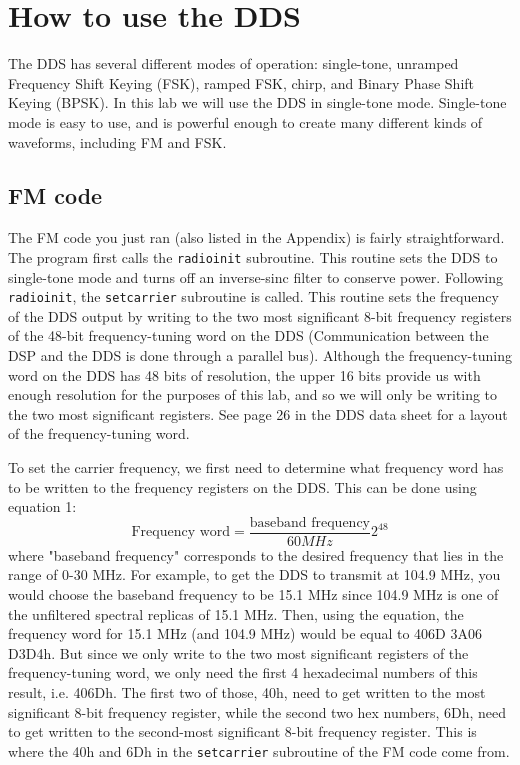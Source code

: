 \section{How to use the DDS}
The DDS has several different modes of operation: single-tone, unramped Frequency 
Shift Keying (FSK), ramped FSK, chirp, and Binary Phase Shift Keying (BPSK).  In
 this lab we will use the DDS in single-tone mode.  Single-tone mode is easy to use, 
and is powerful enough to create many different kinds of waveforms, including FM and FSK.

\subsection{FM code}
The FM code you just ran (also listed in the Appendix) is fairly straightforward.  
The program first calls the \verb+radioinit+ subroutine.  This routine sets the DDS
 to single-tone mode and turns off an inverse-sinc filter to conserve power. 
 Following \verb+radioinit+, the \verb+setcarrier+ subroutine is called.  This routine sets the 
frequency of the DDS output by writing to the two most significant 8-bit frequency 
registers of the 48-bit frequency-tuning word on the DDS (Communication between the DSP and 
the DDS is done through a parallel bus).  Although the frequency-tuning word on the DDS 
has 48 bits of resolution, the upper 16 bits provide us with enough resolution for the 
purposes of this lab, and so we will only be writing to the two most significant registers.  
See page 26 in the DDS data sheet for a layout of the frequency-tuning word.  

To set the carrier frequency, we first need to determine what frequency word has 
to be written to the frequency registers on the DDS.  This can be done using equation 1:
\begin{equation}
\mbox{Frequency word}=\frac{\mbox{baseband frequency}}{60 MHz}2^{48}
\end{equation}
where "baseband frequency" corresponds to the desired frequency that lies in the range 
of 0-30 MHz.  For example, to get the DDS to transmit at 104.9 MHz, you would choose 
the baseband frequency to be 15.1 MHz since 104.9 MHz is one of the unfiltered spectral replicas of 15.1 MHz. 
 Then, using the equation, the frequency word for 15.1 MHz (and 104.9 MHz) would be equal 
to 406D 3A06 D3D4h.  But since we only write to the two most significant registers of the 
frequency-tuning word, we only need the first 4 hexadecimal numbers of this result, i.e. 406Dh.  
The first two of those, 40h, need to get written to the most significant 8-bit frequency 
register, while the second two hex numbers, 6Dh, need to get written to the second-most 
significant 8-bit frequency register.  This is where the 40h and 6Dh in the \verb+setcarrier+ 
subroutine of the FM code come from.  


